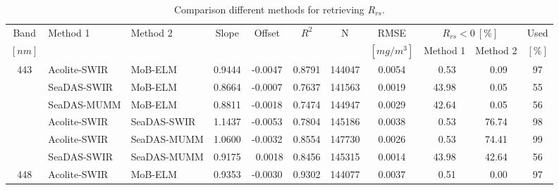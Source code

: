 \documentclass[draft]{spie}  %
\begin{document}
 
\begin{table}[!ht]
\caption{ Comparison different methods for retrieving $R_{rs}$. \label{tab:RrsCompMethod} } 
\centering
\scriptsize
\begin{tabular}{cllcccccccc} 
Band		&   Method 1      &  Method 2	  &	Slope  	&	Offset  &	$R^2 $  &	N      	&	RMSE    &\multicolumn{2}{c}{$R_{rs}<0~[\%]$}   &   Used 	 \\ 
$[nm]$		&	  		      &  		 	  &	  		&			&	   		&	     	&$[mg/m^3]$ & Method 1   	& Method 2  		   & $[\%]$		 \\	\hline \hline
\multirow{6}{*}{443}&Acolite-SWIR&MoB-ELM     &	0.9444 	&	-0.0047 &	0.8791 	&	144047  &	0.0054  &  ~0.53     	& ~0.09      		   &   97   	 \\
			&   SeaDAS-SWIR   &  MoB-ELM      &	0.8664 	&	-0.0007 &	0.7637 	&	141563  &	0.0019  &  43.98    	& ~0.05      		   &   55   	 \\
			&   SeaDAS-MUMM   &  MoB-ELM      &	0.8811 	&	-0.0018 &	0.7474 	&	144947  &	0.0029  &  42.64    	& ~0.05      		   &   56   	 \\
			&   Acolite-SWIR  &  SeaDAS-SWIR  &	1.1437 	&	-0.0053 &	0.7804 	&	145186  &	0.0038  &  ~0.53     	& 76.74     		   &   98   	 \\
			&   Acolite-SWIR  &  SeaDAS-MUMM  &	1.0600 	&	-0.0032 &	0.8554 	&	147730  &	0.0026  &  ~0.53     	& 74.41     		   &   99   	 \\
			&   SeaDAS-SWIR   &  SeaDAS-MUMM  &	0.9175 	&	~0.0018 &	0.8456 	&	145315  &	0.0014  &  43.98    	& 42.64     		   &   56   	 \\  \hline
\multirow{6}{*}{448}&Acolite-SWIR&MoB-ELM     &	0.9353 	&	-0.0030 &	0.9302 	&	144077  &	0.0037  &  ~0.51     	& ~0.00      		   &   97   	 \\

\end{tabular}
\end{table}
\end{document}
